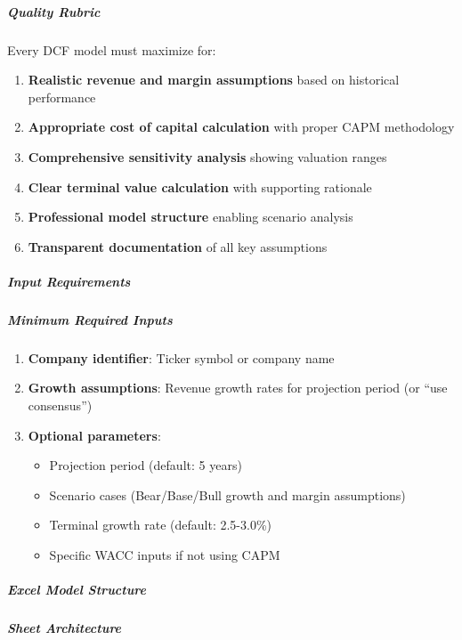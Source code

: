 \documentclass[11pt]{article}
\begin{document}
\subparagraph{Quality Rubric}\mbox{}\par

Every DCF model must maximize for:

\begin{enumerate}[leftmargin=*,itemsep=2pt,topsep=2pt]
\item {} \textbf{Realistic revenue and margin assumptions} based on historical performance
\item {} \textbf{Appropriate cost of capital calculation} with proper CAPM methodology
\item {} \textbf{Comprehensive sensitivity analysis} showing valuation ranges
\item {} \textbf{Clear terminal value calculation} with supporting rationale
\item {} \textbf{Professional model structure} enabling scenario analysis
\item {} \textbf{Transparent documentation} of all key assumptions
\end{enumerate}

\subparagraph{Input Requirements}\mbox{}\par

\subparagraph{Minimum Required Inputs}\mbox{}\par
\begin{enumerate}[leftmargin=*,itemsep=2pt,topsep=2pt]
\item {} \textbf{Company identifier}: Ticker symbol or company name
\item {} \textbf{Growth assumptions}: Revenue growth rates for projection period (or ``use consensus'')
\item {} \textbf{Optional parameters}:
\begin{itemize}[leftmargin=*,itemsep=2pt,topsep=2pt]
\item {} Projection period (default: 5 years)
\item {} Scenario cases (Bear/Base/Bull growth and margin assumptions)
\item {} Terminal growth rate (default: 2.5-3.0\%)
\item {} Specific WACC inputs if not using CAPM
\end{itemize}
\end{enumerate}

\subparagraph{Excel Model Structure}\mbox{}\par

\subparagraph{Sheet Architecture}\mbox{}\par
\end{document}
